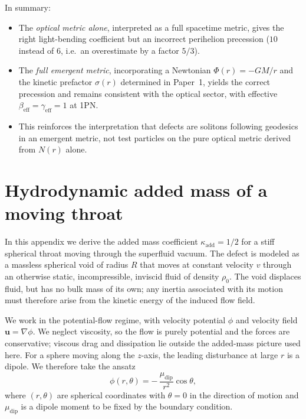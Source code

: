 \documentclass[11pt]{article}
\begin{document}
In summary:

\begin{itemize}
  \item The \emph{optical metric alone}, interpreted as a full spacetime
        metric, gives the right light-bending coefficient but an incorrect
        perihelion precession ($10$ instead of $6$, i.e.\ an overestimate
        by a factor $5/3$).
  \item The \emph{full emergent metric}, incorporating a Newtonian
        $\Phi(r)=-GM/r$ and the kinetic prefactor $\sigma(r)$ determined in
        Paper~1, yields the correct precession and remains consistent with the
        optical sector, with effective
        $\beta_{\text{eff}} = \gamma_{\text{eff}} = 1$ at 1PN.
  \item This reinforces the interpretation that defects are solitons
        following geodesics in an emergent metric, not test particles on
        the pure optical metric derived from $N(r)$ alone.
\end{itemize}

\section{Hydrodynamic added mass of a moving throat}
\label{app:dipole-derivation}

In this appendix we derive the added mass coefficient
$\kappa_{\mathrm{add}} = 1/2$ for a stiff spherical throat moving through
the superfluid vacuum.  The defect is modeled as a massless spherical void
of radius $R$ that moves at constant velocity $v$ through an otherwise
static, incompressible, inviscid fluid of density $\rho_0$.  The void displaces
fluid, but has no bulk mass of its own; any inertia associated with its motion
must therefore arise from the kinetic energy of the induced flow field.

We work in the potential-flow regime, with velocity potential $\phi$ and
velocity field $\mathbf{u} = \nabla\phi$.
We neglect viscosity, so the flow is purely potential and the forces are
conservative; viscous drag and dissipation lie outside the added-mass
picture used here.
For a sphere moving along the $z$-axis, the leading disturbance at large $r$
is a dipole.  We therefore take the ansatz
\begin{equation}
  \phi(r,\theta) = -\,\frac{\mu_{\mathrm{dip}}}{r^2}\cos\theta,
\end{equation}
where $(r,\theta)$ are spherical coordinates with $\theta=0$ in the
direction of motion and $\mu_{\mathrm{dip}}$ is a dipole moment to be fixed
by the boundary condition.
\end{document}
